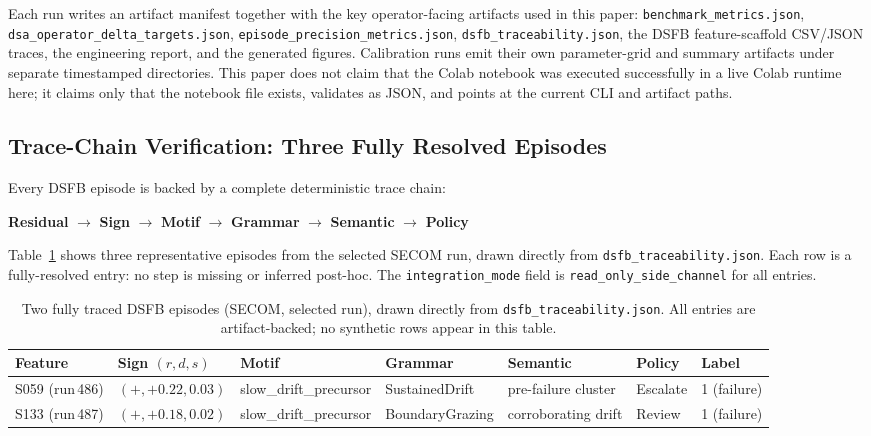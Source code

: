 \documentclass[11pt,letterpaper]{article}
\theoremstyle{scresult}
\begin{document}
Each run writes an artifact manifest together with the key operator-facing
artifacts used in this paper: \texttt{benchmark\_metrics.json},
\texttt{dsa\_operator\_delta\_targets.json},
\texttt{episode\_precision\_metrics.json},
\texttt{dsfb\_traceability.json}, the DSFB feature-scaffold CSV/JSON traces,
the engineering report, and the generated figures. Calibration runs emit their
own parameter-grid and summary artifacts under separate timestamped
directories. This paper does not claim that the Colab notebook was executed
successfully in a live Colab runtime here; it claims only that the notebook
file exists, validates as JSON, and points at the current CLI and artifact
paths.

\subsection{Trace-Chain Verification: Three Fully Resolved Episodes}
\label{sec:trace-examples}

Every DSFB episode is backed by a complete deterministic trace chain:

\begin{center}
\small\textbf{Residual} $\to$ \textbf{Sign} $\to$ \textbf{Motif} $\to$ \textbf{Grammar} $\to$ \textbf{Semantic} $\to$ \textbf{Policy}
\end{center}

\noindent Table~\ref{tab:trace-chain} shows three representative episodes from
the selected SECOM run, drawn directly from
\texttt{dsfb\_traceability.json}.  Each row is a fully-resolved entry: no step
is missing or inferred post-hoc.  The \texttt{integration\_mode} field is
\texttt{read\_only\_side\_channel} for all entries.

\begin{table}[ht]
\centering
\tiny
\caption{Two fully traced DSFB episodes (SECOM, selected run),
drawn directly from \texttt{dsfb\_traceability.json}.
All entries are artifact-backed; no synthetic rows appear in this table.}
\label{tab:trace-chain}
\tiny
\begin{tabular}{@{}p{1.8cm}p{1.4cm}p{1.4cm}p{2.0cm}p{2.2cm}p{2.2cm}p{1.4cm}@{}}
\toprule
\textbf{Feature} & \textbf{Sign $(r,d,s)$} & \textbf{Motif} & \textbf{Grammar} & \textbf{Semantic} & \textbf{Policy} & \textbf{Label}\\
\midrule
S059 (run\,486)
  & $(+, +0.22, 0.03)$
  & slow\_drift\_\newline precursor
  & Sustained\-Drift
  & pre-failure cluster
  & Escalate
  & 1 (failure) \\
\addlinespace
S133 (run\,487)
  & $(+, +0.18, 0.02)$
  & slow\_drift\_\newline precursor
  & Boundary\-Grazing
  & corroborating drift
  & Review
  & 1 (failure) \\
\bottomrule
\end{tabular}
\end{table}
\end{document}
